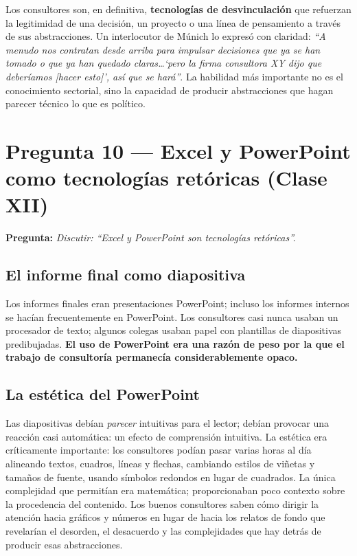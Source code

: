 \documentclass[a4paper,12pt]{article}
\begin{document}
Los consultores son, en definitiva, \textbf{tecnologías de desvinculación} que refuerzan la legitimidad de una decisión, un proyecto o una línea de pensamiento a través de sus abstracciones. Un interlocutor de Múnich lo expresó con claridad: \textit{``A menudo nos contratan desde arriba para impulsar decisiones que ya se han tomado o que ya han quedado claras\ldots `pero la firma consultora XY dijo que deberíamos [hacer esto]', así que se hará''}. La habilidad más importante no es el conocimiento sectorial, sino la capacidad de producir abstracciones que hagan parecer técnico lo que es político.

\vspace{1.5em}

\section{Pregunta 10 — Excel y PowerPoint como tecnologías retóricas (Clase XII)}

\textbf{Pregunta:} \textit{Discutir: ``Excel y PowerPoint son tecnologías retóricas''.}

\subsection*{El informe final como diapositiva}

Los informes finales eran presentaciones PowerPoint; incluso los informes internos se hacían frecuentemente en PowerPoint. Los consultores casi nunca usaban un procesador de texto; algunos colegas usaban papel con plantillas de diapositivas predibujadas. \textbf{El uso de PowerPoint era una razón de peso por la que el trabajo de consultoría permanecía considerablemente opaco.}

\subsection*{La estética del PowerPoint}

Las diapositivas debían \textit{parecer} intuitivas para el lector; debían provocar una reacción casi automática: un efecto de comprensión intuitiva. La estética era críticamente importante: los consultores podían pasar varias horas al día alineando textos, cuadros, líneas y flechas, cambiando estilos de viñetas y tamaños de fuente, usando símbolos redondos en lugar de cuadrados. La única complejidad que permitían era matemática; proporcionaban poco contexto sobre la procedencia del contenido. Los buenos consultores saben cómo dirigir la atención hacia gráficos y números en lugar de hacia los relatos de fondo que revelarían el desorden, el desacuerdo y las complejidades que hay detrás de producir esas abstracciones.
\end{document}
